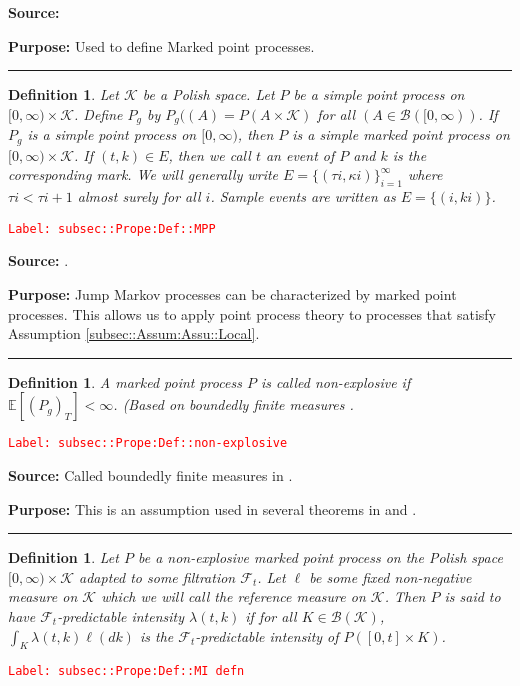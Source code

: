 \documentclass[12pt]{article}
\newcommand{\mb}{\mathbb}
\newcommand{\mc}{\mathcal}
\newcommand{\ms}{\mathscr}
\newcommand{\tr}{\textcolor{red}}
\newcommand{\labe}[1]{\tr{\texttt{Label: #1}}}
\newcommand{\purpose}{\textbf{Purpose: }}
\newcommand{\lin}{\rule{\linewidth}{0.4 pt}}
\newcommand{\ex}[1]{\mb{E}\left[#1\right]}			%
\renewcommand{\t}{t}							%
\newcommand{\F}{\mc{F}}							%
\newcommand{\ts}[1]{_{#1}}						%
\newcommand{\rate}{\lambda}						%
\newcommand{\rt}{\tau}							%
\renewcommand{\mark}{\kappa}					%
\newcommand{\rp}{P}								%
\newcommand{\typset}{A}							%
\newcommand{\evs}{E}							%
\newcommand{\mspce}{\mc{K}}						%
\newcommand{\rpg}{\rp_g}						%
\newtheorem{defn}[thms]{Definition}
\begin{document}
\textbf{Source: }\cite[Definition 9.1.II]{DalVer08}

\purpose Used to define Marked point processes.

\lin

\begin{defn}
Let \(\mspce\) be a Polish space. Let \(\rp\) be a simple point process on \([0,\infty)\times \mspce\). Define \(\rpg\) by \(\rpg((\typset) = \rp(\typset\times \mspce)\) for all \((\typset \in \ms{B}([0,\infty))\). If \(\rpg\) is a simple point process on \([0,\infty)\), then \(\rp\) is a simple marked point process on \([0,\infty)\times \mspce\). If \((\t,k) \in \evs\), then we call \(\t\) an event of \(\rp\) and \(k\) is the corresponding mark. We will generally write \(\evs = \{(\rt{i},\mark{i})\}_{i=1}^{\infty}\) where \(\rt{i} < \rt{i+1}\) almost surely for all \(i\). Sample events are written as \(\evs = \{(	{i},k{i})\}\). 
\label{subsec::Prope:Def::MPP}
\end{defn}
\labe{subsec::Prope:Def::MPP}

\textbf{Source: }\cite[Definition 6.4.I]{DalVer03}.

\purpose Jump Markov processes can be characterized by marked point processes. This allows us to apply point process theory to processes that satisfy Assumption \ref{subsec::Assum:Assu::Local}.

\lin

\begin{defn}
A marked point process \(\rp\) is called non-explosive if \(\ex{(\rpg)_T} < \infty\). (Based on boundedly finite measures \cite[Definition 9.1.I]{DalVer08}.
\label{subsec::Prope:Def::non-explosive}
\end{defn}
\labe{subsec::Prope:Def::non-explosive}

\textbf{Source: } Called boundedly finite measures in \cite[Definition 9.1.I]{DalVer08}.

\purpose This is an assumption used in several theorems in \cite{DalVer03} and \cite{DalVer08}.

\lin

\begin{defn}
Let \(\rp\) be a non-explosive marked point process on the Polish space \([0,\infty)\times \mspce\) adapted to some filtration \(\F\ts{\t}\). Let \(\ell\) be some fixed non-negative measure on \(\mspce\) which we will call the reference measure on \(\mspce\). Then \(\rp\) is said to have \(\F\ts{\t}\)-predictable intensity \(\rate(\t,k)\) if for all \(K \in \ms{B}(\mspce)\), \(\int_K \rate(\t,k)\ell(dk)\) is the \(\F\ts{\t}\)-predictable intensity of \(\rp([0,\t]\times K)\). 
\label{subsec::Prope:Def::MI defn}
\end{defn}
\labe{subsec::Prope:Def::MI defn}
\end{document}
